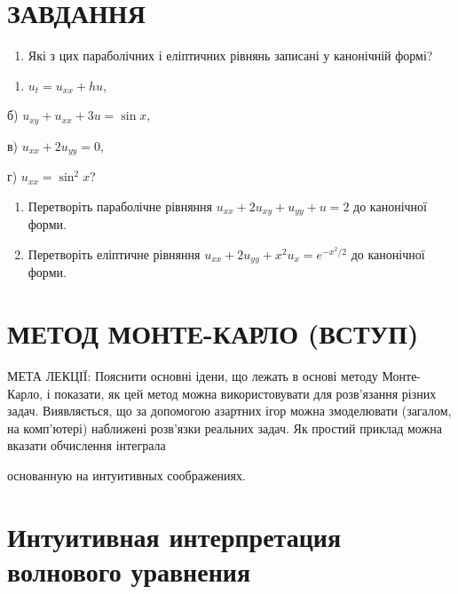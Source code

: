 \documentclass[
  ukrainian,
]{article}
\providecommand{\tightlist}{%
  \setlength{\itemsep}{0pt}\setlength{\parskip}{0pt}}
\begin{document}
\section{ЗАВДАННЯ}\label{ux437ux430ux432ux434ux430ux43dux43dux44f-11}

\begin{enumerate}
\def\labelenumi{\arabic{enumi}.}
\tightlist
\item
  Які з цих параболічних і еліптичних рівнянь записані у канонічній
  формі?
\end{enumerate}

\begin{enumerate}
\def\labelenumi{\alph{enumi})}
\tightlist
\item
  \(u_t = u_{xx} + hu\),
\end{enumerate}

б) \(u_{xy} + u_{xx} + 3u = \sin x\),

в) \(u_{xx} + 2u_{yy} = 0\),

г) \(u_{xx} = \sin^2 x\)?

\begin{enumerate}
\def\labelenumi{\arabic{enumi}.}
\setcounter{enumi}{1}
\item
  Перетворіть параболічне рівняння \(u_{xx} + 2u_{xy} + u_{yy} + u = 2\)
  до канонічної форми.
\item
  Перетворіть еліптичне рівняння
  \(u_{xx} + 2u_{yy} + x^2 u_x = e^{-x^2/2}\) до канонічної форми.
\end{enumerate}

\section{МЕТОД МОНТЕ-КАРЛО
(ВСТУП)}\label{ux43cux435ux442ux43eux434-ux43cux43eux43dux442ux435-ux43aux430ux440ux43bux43e-ux432ux441ux442ux443ux43f}

МЕТА ЛЕКЦІЇ: Пояснити основні ідени, що лежать в основі методу
Монте-Карло, і показати, як цей метод можна використовувати для
розв'язання різних задач. Виявляється, що за допомогою азартних ігор
можна змоделювати (загалом, на комп'ютері) наближені розв'язки реальних
задач. Як простий приклад можна вказати обчислення інтеграла

основанную на интуитивных соображениях.

\section{Интуитивная интерпретация волнового
уравнения}\label{ux438ux43dux442ux443ux438ux442ux438ux432ux43dux430ux44f-ux438ux43dux442ux435ux440ux43fux440ux435ux442ux430ux446ux438ux44f-ux432ux43eux43bux43dux43eux432ux43eux433ux43e-ux443ux440ux430ux432ux43dux435ux43dux438ux44f}
\end{document}
